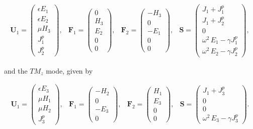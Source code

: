 \begin{equation*}
\begin{array}{ccccc}
\mathbf{U}_1 = \begin{pmatrix} \epsilon E_1 \\ \epsilon E_2 \\ \mu H_3 \\ J^p_1 \\  J^p_2 \end{pmatrix} ,
&
\mathbf{F}_1 = \begin{pmatrix} 0 \\ H_3 \\ E_2 \\ 0 \\  0 \end{pmatrix} ,
&
\mathbf{F}_2 = \begin{pmatrix} - H_3 \\ 0 \\ -E_1 \\ 0 \\ 0 \end{pmatrix} ,
&
\mathbf{S} = \begin{pmatrix} J_1 + J^p_1 \\ J_1 + J^p_2 \\ 0 \\ \omega^2 \, E_1 - \gamma J^p_1 \\  \omega^2 \, E_2 - \gamma J^p_2 \end{pmatrix} ,
\end{array}
\:
\end{equation*}

and the $TM_z$ mode, given by

\begin{equation*}
\begin{array}{ccccc}
\mathbf{U}_1 = \begin{pmatrix} \epsilon E_3 \\ \mu H_1 \\ \mu H_2 \\ J^p_3 \end{pmatrix} ,
&
\mathbf{F}_1 = \begin{pmatrix} -H_2 \\ 0 \\ -E_3 \\ 0 \end{pmatrix} ,
&
\mathbf{F}_2 = \begin{pmatrix} H_1 \\ E_3 \\ 0 \\ 0 \end{pmatrix} ,
&
\mathbf{S} = \begin{pmatrix} J_1 + J^p_3 \\ 0 \\ 0 \\ \omega^2 \, E_3 - \gamma J^p_3 \end{pmatrix} .
\end{array}
\:
\end{equation*}

